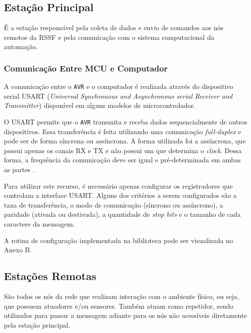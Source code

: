 \subsection{Estação Principal}
É a estação responsável pela coleta de dados e envio de comandos aos nós remotos da RSSF e pela comunicação
com o sistema computacional da automação.


\subsubsection{Comunicação Entre MCU e Computador}
A comunicação entre o \texttt{AVR} e o computador é realizada através do dispositivo serial USART
(\textit{Universal Synchronous and Asynchronous serial Receiver and Transmitter}) disponível em alguns modelos
de microcontrolador.

O USART permite que o \texttt{AVR} transmita e receba dados sequencialmente de outros dispositivos. Essa
transferência é feita utilizando uma comunicação \textit{full-duplex} e pode ser de forma síncrona ou
assíncrona. A forma utilizada foi a assíncrona, que possui apenas os canais RX e TX e não possui um que
determina o \textit{clock}. Dessa forma, a frequência da comunicação deve ser igual e pré-determinada em ambas
as partes \cite{williams2014}.

Para utilizar este recurso, é necessário apenas configurar os registradores que controlam a interface USART.
Alguns dos critérios a serem configurados são a taxa de transferência, o modo de comunicação (síncrono ou
assíncrono), a paridade (ativada ou destivada), a quantidade de \textit{stop bits} e o tamanho de cada
caractere da mensagem.

A rotina de configuração implementada na biblioteca pode ser visualizada no Anexo B.

\subsection{Estações Remotas}
São todos os nós da rede que realizam interação com o ambiente físico, ou seja, que possuem atuadores e/ou
sensores. Também atuam como repetidor, sendo utilizados para passar a mensagem adiante para os nós não acessíveis
diretamente pela estação principal.


